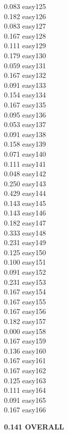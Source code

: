 \documentclass[10pt]{article}
\begin{document}
\begin{enumerate}
\begin{enumerate}
\begin{multicols}{5}
            0.083 easy125\\
            0.182 easy126\\
            0.083 easy127\\
            0.167 easy128\\
            0.111 easy129\\
            0.179 easy130\\
            0.059 easy131\\
            0.167 easy132\\
            0.091 easy133\\
            0.154 easy134\\
            0.167 easy135\\
            0.095 easy136\\
            0.053 easy137\\
            0.091 easy138\\
            0.158 easy139\\
            0.071 easy140\\
            0.111 easy141\\
            0.048 easy142\\
            0.250 easy143\\
            0.429 easy144\\
            0.143 easy145\\
            0.143 easy146\\
            0.182 easy147\\
            0.333 easy148\\
            0.231 easy149\\
            0.125 easy150\\
            0.100 easy151\\
            0.091 easy152\\
            0.231 easy153\\
            0.167 easy154\\
            0.167 easy155\\
            0.167 easy156\\
            0.182 easy157\\
            0.000 easy158\\
            0.167 easy159\\
            0.136 easy160\\
            0.167 easy161\\
            0.167 easy162\\
            0.125 easy163\\
            0.111 easy164\\
            0.091 easy165\\
            0.167 easy166\\
            \end{multicols}
            \textbf{0.141 OVERALL}\\    
            

\end{enumerate}
\end{enumerate}
\end{document}
